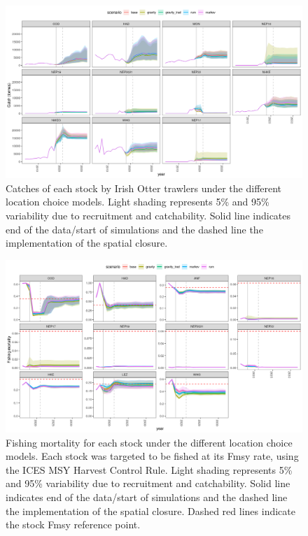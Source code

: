 \documentclass[12pt, halfline, a4paper]{ouparticle}
\begin{document}
\begin{figure}[!ht]
	\centering
	\includegraphics[width=1\linewidth]{figures/IE_Otter_catches}
	\caption{Catches of each stock by Irish Otter trawlers under the
		different location choice models. Light shading represents 5\%
		and 95\% variability due to recruitment and catchability. Solid
		line indicates end of the data/start of simulations and the
		dashed line the implementation of the spatial closure.} 
	\label{fig:OtterC}
\end{figure}	

\begin{figure}[!ht]
	\centering
	\includegraphics[width=1\linewidth]{figures/F_difference}
	\caption{Fishing mortality for each stock under the different location
		choice models. Each stock was targeted to be fished at its Fmsy
		rate, using the ICES MSY Harvest Control Rule. Light shading
		represents 5\% and 95\% variability due to recruitment and
		catchability. Solid line indicates end of the data/start of
		simulations and the dashed line the implementation of the
		spatial closure. Dashed red lines indicate the stock Fmsy
		reference point.} 
	\label{fig:F}
\end{figure}	
\end{document}
